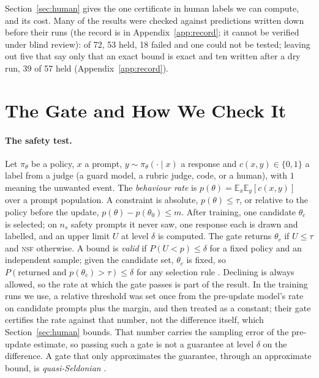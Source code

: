 \documentclass[letterpaper]{article} %
\newcommand{\NSF}{\textsc{nsf}}
\begin{document}
Section~\ref{sec:human} gives the one certificate in human labels we can compute, and its cost. Many of the results
were checked against predictions written down before their runs (the record is in Appendix~\ref{app:record}; it cannot be verified under blind review): of 72, 53 held, 18 failed and one could not be tested;
leaving out five that say only that an exact bound is exact and ten written after a dry run, 39 of 57 held
(Appendix~\ref{app:record}).

\section{The Gate and How We Check It}
\label{sec:setup}

\paragraph{The safety test.} Let $\pi_\theta$ be a policy, $x$ a prompt, $y\sim\pi_\theta(\cdot\mid x)$ a response and
$c(x,y)\in\{0,1\}$ a label from a judge (a guard model, a rubric judge, code, or a human), with $1$ meaning the unwanted
event. The \emph{behaviour rate} is $p(\theta)=\mathbb{E}_x\mathbb{E}_y[c(x,y)]$ over a prompt population. A
constraint is absolute, $p(\theta)\le\tau$, or relative to the policy before the update, $p(\theta)-p(\theta_0)\le m$.
After training, one candidate $\theta_c$ is selected; on $n_s$ safety prompts it never saw, one response each is drawn
and labelled, and an upper limit $U$ at level $\delta$ is computed. The gate returns $\theta_c$ if $U\le\tau$ and
\NSF{} otherwise. A bound is \emph{valid} if $P(U<p)\le\delta$ for a fixed policy and an independent sample; given the
candidate set, $\theta_c$ is fixed, so $P(\text{returned and }p(\theta_c)>\tau)\le\delta$ for any selection rule
\citep{thomas2019preventing}. Declining is always allowed, so the rate at which the gate passes is part of the result.
In the training runs we use, a relative threshold was set once from the pre-update model's rate on
candidate prompts plus the margin, and then treated as a constant; their gate certifies the rate against that number, not
the difference itself, which Section~\ref{sec:human} bounds. That number carries the sampling error of the pre-update
estimate, so passing such a gate is not a guarantee at level $\delta$ on the difference. A gate that only approximates the guarantee, through an
approximate bound, is \emph{quasi-Seldonian} \citep{thomas2019preventing}.
\end{document}
